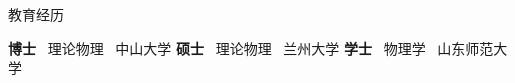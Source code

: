 \begin{rubric}{教育经历}

\entry*[2017 -- 2020]%
    \textbf{博士}~ 理论物理~ 中山大学 
%
\entry*[2013 -- 2016]%
    \textbf{硕士}~ 理论物理~ 兰州大学%
\entry*[2009 -- 2013]%
    \textbf{学士}~ 物理学~   山东师范大学 %
\end{rubric}

